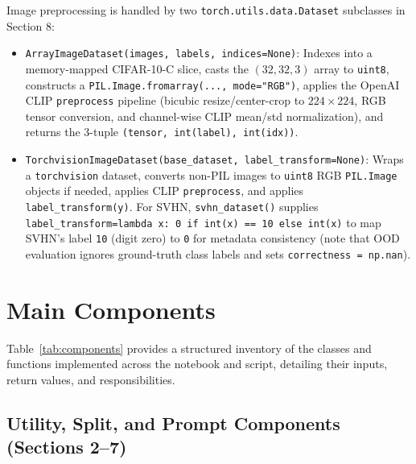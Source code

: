 \documentclass[11pt,a4paper]{article}
\begin{document}
Image preprocessing is handled by two \texttt{torch.\allowbreak{}utils.\allowbreak{}data.\allowbreak{}Dataset} subclasses in Section 8:
\begin{itemize}
  \item \texttt{ArrayImageDataset(\allowbreak{}images,\allowbreak{} labels,\allowbreak{} indices=None)}: Indexes into a memory-mapped CIFAR-10-C slice, casts the $(32, 32, 3)$ array to \texttt{uint8}, constructs a \texttt{PIL.\allowbreak{}Image.\allowbreak{}fromarray(\allowbreak{}.\allowbreak{}.\allowbreak{}.\allowbreak{},\allowbreak{} mode="RGB")}, applies the OpenAI CLIP \texttt{preprocess} pipeline (bicubic resize/center-crop to $224 \times 224$, RGB tensor conversion, and channel-wise CLIP mean/std normalization), and returns the 3-tuple \texttt{(\allowbreak{}tensor,\allowbreak{} int(\allowbreak{}label),\allowbreak{} int(\allowbreak{}idx))}.
  \item \texttt{TorchvisionImageDataset(\allowbreak{}base\_\allowbreak{}dataset,\allowbreak{} label\_\allowbreak{}transform=None)}: Wraps a \texttt{torchvision} dataset, converts non-PIL images to \texttt{uint8} RGB \texttt{PIL.\allowbreak{}Image} objects if needed, applies CLIP \texttt{preprocess}, and applies \texttt{label\_\allowbreak{}transform(\allowbreak{}y)}. For SVHN, \texttt{svhn\_\allowbreak{}dataset(\allowbreak{})} supplies \texttt{label\_\allowbreak{}transform=lambda x: 0 if int(\allowbreak{}x) == 10 else int(\allowbreak{}x)} to map SVHN's label \texttt{10} (digit zero) to \texttt{0} for metadata consistency (note that OOD evaluation ignores ground-truth class labels and sets \texttt{correctness = np.\allowbreak{}nan}).
\end{itemize}

\section{Main Components}

Table~\ref{tab:components} provides a structured inventory of the classes and functions implemented across the notebook and script, detailing their inputs, return values, and responsibilities.

\subsection{Utility, Split, and Prompt Components (Sections 2--7)}
\end{document}
